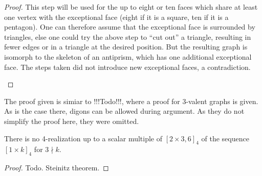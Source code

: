 \begin{lemma}
\begin{proof}
    This step will be used for the up to eight or ten faces which share at least one vertex with the exceptional face (eight if it is a square, ten if it is a pentagon). One can therefore assume that the exceptional face is surrounded by triangles, else one could try the above step to ``cut out'' a triangle, resulting in fewer edges or in a triangle at the desired position. But the resulting graph is isomorph to the skeleton of an antiprism, which has one additional exceptional face. The steps taken did not introduce new exceptional faces, a contradiction.
    \begin{figure}[htpp]
      \centering
    \end{figure}
  \end{proof}
\end{lemma}
\begin{remark}
  The proof given is simiar to !!!Todo!!!, where a proof for $3$-valent graphs is given. As is the case there, digons can be allowed during argument. As they do not simplify the proof here, they were omitted.
\end{remark}
\begin{corollary}
  There is no 4-realization up to a scalar multiple of $[2 \times 3, 6]_4$ of the sequence $[1 \times k]_4$ for $3 \nmid k$.
  \begin{proof}
    Todo. Steinitz theorem.
  \end{proof}
\end{corollary}




